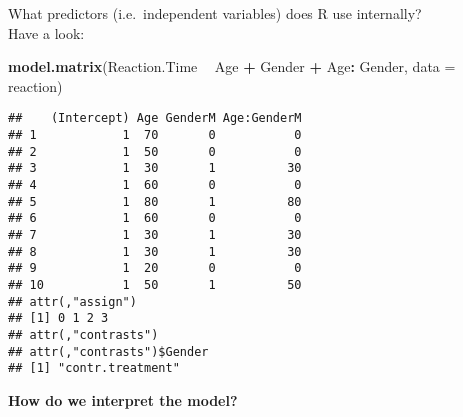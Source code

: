 \documentclass[
]{article}
\newenvironment{Shaded}{\begin{snugshade}}{\end{snugshade}}
\newcommand{\DataTypeTok}[1]{\textcolor[rgb]{0.13,0.29,0.53}{#1}}
\newcommand{\DecValTok}[1]{\textcolor[rgb]{0.00,0.00,0.81}{#1}}
\newcommand{\KeywordTok}[1]{\textcolor[rgb]{0.13,0.29,0.53}{\textbf{#1}}}
\newcommand{\NormalTok}[1]{#1}
\newcommand{\OperatorTok}[1]{\textcolor[rgb]{0.81,0.36,0.00}{\textbf{#1}}}
\newcommand{\StringTok}[1]{\textcolor[rgb]{0.31,0.60,0.02}{#1}}
\begin{document}
What predictors (i.e.~independent variables) does R use internally?\\
Have a look:

\begin{Shaded}
\begin{Highlighting}[]
\KeywordTok{model.matrix}\NormalTok{(Reaction.Time }\OperatorTok{~}\StringTok{ }\NormalTok{Age }\OperatorTok{+}\StringTok{ }\NormalTok{Gender }\OperatorTok{+}\StringTok{ }\NormalTok{Age}\OperatorTok{:}\StringTok{ }\NormalTok{Gender, }\DataTypeTok{data =}\NormalTok{ reaction)}
\end{Highlighting}
\end{Shaded}

\begin{verbatim}
##    (Intercept) Age GenderM Age:GenderM
## 1            1  70       0           0
## 2            1  50       0           0
## 3            1  30       1          30
## 4            1  60       0           0
## 5            1  80       1          80
## 6            1  60       0           0
## 7            1  30       1          30
## 8            1  30       1          30
## 9            1  20       0           0
## 10           1  50       1          50
## attr(,"assign")
## [1] 0 1 2 3
## attr(,"contrasts")
## attr(,"contrasts")$Gender
## [1] "contr.treatment"
\end{verbatim}

\textbf{How do we interpret the model?}

\begin{Shaded}
\end{Shaded}
\end{document}
